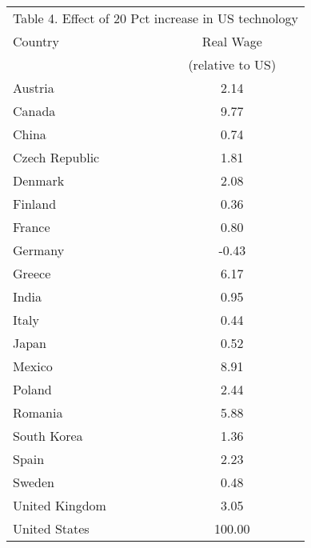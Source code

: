 \begin{tabular}{lc} \hline
 \multicolumn{2}{c}{Table 4. Effect of 20 Pct increase in US technology} \\ \cline{1-2}
 Country & Real Wage \\
  & (relative to US) \\ \hline
Austria&2.14\\
Canada&9.77\\
China&0.74\\
Czech Republic&1.81\\
Denmark&2.08\\
Finland&0.36\\
France&0.80\\
Germany&-0.43\\
Greece&6.17\\
India&0.95\\
Italy&0.44\\
Japan&0.52\\
Mexico&8.91\\
Poland&2.44\\
Romania&5.88\\
South Korea&1.36\\
Spain&2.23\\
Sweden&0.48\\
United Kingdom&3.05\\
United States&100.00\\
\hline \end{tabular}
